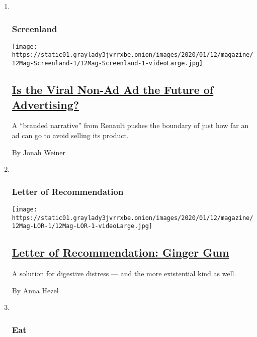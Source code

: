 \begin{enumerate}
\def\labelenumi{\arabic{enumi}.}
\item ~
  \hypertarget{screenland}{%
  \subsubsection{Screenland}\label{screenland}}

  \texttt{[image: https://static01.graylady3jvrrxbe.onion/images/2020/01/12/magazine/12Mag-Screenland-1/12Mag-Screenland-1-videoLarge.jpg]}

  \hypertarget{is-the-viral-non-ad-ad-the-future-of-advertising}{%
  \subsection{\texorpdfstring{\href{/2020/01/08/magazine/is-the-viral-non-ad-ad-the-future-of-advertising.html}{Is
  the Viral Non-Ad Ad the Future of
  Advertising?}}{Is the Viral Non-Ad Ad the Future of Advertising?}}\label{is-the-viral-non-ad-ad-the-future-of-advertising}}

  A ``branded narrative'' from Renault pushes the boundary of just how
  far an ad can go to avoid selling its product.

  By Jonah Weiner
\item ~
  \hypertarget{letter-of-recommendation}{%
  \subsubsection{Letter of
  Recommendation}\label{letter-of-recommendation}}

  \texttt{[image: https://static01.graylady3jvrrxbe.onion/images/2020/01/12/magazine/12Mag-LOR-1/12Mag-LOR-1-videoLarge.jpg]}

  \hypertarget{letter-of-recommendation-ginger-gum}{%
  \subsection{\texorpdfstring{\href{/2020/01/07/magazine/letter-of-recommendation-ginger-gum.html}{Letter
  of Recommendation: Ginger
  Gum}}{Letter of Recommendation: Ginger Gum}}\label{letter-of-recommendation-ginger-gum}}

  A solution for digestive distress --- and the more existential kind as
  well.

  By Anna Hezel
\item ~
  \hypertarget{eat}{%
  \subsubsection{Eat}\label{eat}}


\end{enumerate}
